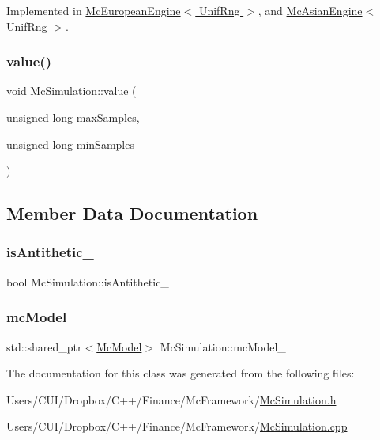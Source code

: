 Implemented in \hyperlink{class_mc_european_engine_a76252919552e4061795e30f30947a1ee}{Mc\+European\+Engine$<$ Unif\+Rng $>$}, and \hyperlink{class_mc_asian_engine_a4c16366e8dec7d689e934cbafe413332}{Mc\+Asian\+Engine$<$ Unif\+Rng $>$}.

\hypertarget{class_mc_simulation_a5f74044189f64941f7fd3aaa4acc8e8e}{}\label{class_mc_simulation_a5f74044189f64941f7fd3aaa4acc8e8e} 
\subsubsection{\texorpdfstring{value()}{value()}}
{\footnotesize\ttfamily void Mc\+Simulation\+::value (\begin{DoxyParamCaption}\item[{unsigned long}]{max\+Samples,  }\item[{unsigned long}]{min\+Samples }\end{DoxyParamCaption})}



\subsection{Member Data Documentation}
\hypertarget{class_mc_simulation_aabbb28856a126b01552583a571e1e807}{}\label{class_mc_simulation_aabbb28856a126b01552583a571e1e807} 
\subsubsection{\texorpdfstring{is\+Antithetic\+\_\+}{isAntithetic\_}}
{\footnotesize\ttfamily bool Mc\+Simulation\+::is\+Antithetic\+\_\+\hspace{0.3cm}{\ttfamily [private]}}

\hypertarget{class_mc_simulation_a7f6445b880401bcd208fd921ca8d82c2}{}\label{class_mc_simulation_a7f6445b880401bcd208fd921ca8d82c2} 
\subsubsection{\texorpdfstring{mc\+Model\+\_\+}{mcModel\_}}
{\footnotesize\ttfamily std\+::shared\+\_\+ptr$<$\hyperlink{class_mc_model}{Mc\+Model}$>$ Mc\+Simulation\+::mc\+Model\+\_\+\hspace{0.3cm}{\ttfamily [private]}}



The documentation for this class was generated from the following files\+:\begin{DoxyCompactItemize}
\item 
Users/\+C\+U\+I/\+Dropbox/\+C++/\+Finance/\+Mc\+Framework/\hyperlink{_mc_simulation_8h}{Mc\+Simulation.\+h}\item 
Users/\+C\+U\+I/\+Dropbox/\+C++/\+Finance/\+Mc\+Framework/\hyperlink{_mc_simulation_8cpp}{Mc\+Simulation.\+cpp}\end{DoxyCompactItemize}
